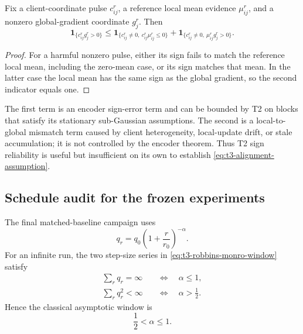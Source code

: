 \begin{lemma}
\label{lem:t3-local-global-split}
Fix a client-coordinate pulse $c_{ij}^r$, a reference local mean evidence
$\mu_{ij}^r$, and a nonzero global-gradient coordinate $g_j^r$.  Then
\begin{equation}
    \mathbf{1}_{\{c_{ij}^rg_j^r>0\}}
    \leq
    \mathbf{1}_{\{c_{ij}^r\neq0,\ c_{ij}^r\mu_{ij}^r\leq0\}}
    +
    \mathbf{1}_{\{c_{ij}^r\neq0,\ \mu_{ij}^rg_j^r>0\}}.
    \label{eq:t3-local-global-split}
\end{equation}
\end{lemma}

\begin{proof}
For a harmful nonzero pulse, either its sign fails to match the reference local
mean, including the zero-mean case, or its sign matches that mean.  In the
latter case the local mean has the same sign as the global gradient, so the
second indicator equals one.
\end{proof}

The first term is an encoder sign-error term and can be bounded by T2 on blocks
that satisfy its stationary sub-Gaussian assumptions.  The second is a
local-to-global mismatch term caused by client heterogeneity, local-update
drift, or stale accumulation; it is not controlled by the encoder theorem.
Thus T2 sign reliability is useful but insufficient on its own to establish
\eqref{eq:t3-alignment-assumption}.

\subsection{Schedule audit for the frozen experiments}

The final matched-baseline campaign uses
\begin{equation}
    q_r=q_0\left(1+\frac{r}{r_0}\right)^{-\alpha}.
    \label{eq:t3-power-law-schedule}
\end{equation}
For an infinite run, the two step-size series in
\eqref{eq:t3-robbins-monro-window} satisfy
\begin{align}
    \sum_rq_r=\infty
    &\quad\Longleftrightarrow\quad \alpha\leq1,
    \\
    \sum_rq_r^2<\infty
    &\quad\Longleftrightarrow\quad \alpha>\frac12.
    \label{eq:t3-power-law-window}
\end{align}
Hence the classical asymptotic window is
\begin{equation}
    \frac12<\alpha\leq1.
    \label{eq:t3-alpha-window}
\end{equation}


